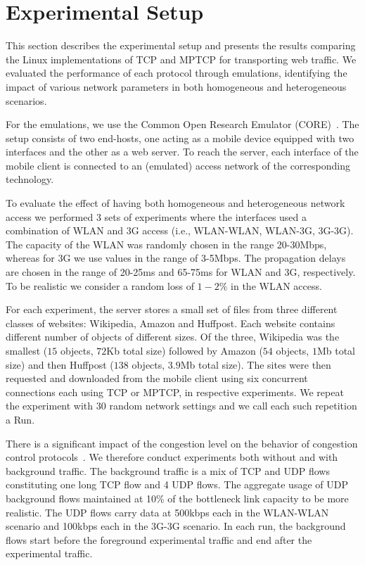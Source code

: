 \section{Experimental Setup }
\label{sec:exp-setup}
This section describes the experimental setup and presents the results comparing
the Linux implementations of TCP and MPTCP for transporting web traffic. We
evaluated the performance of each protocol through emulations, identifying the impact of various network
parameters in both homogeneous and heterogeneous scenarios. 

For the emulations, we use the Common Open Research Emulator (CORE)~\cite{CORE}. The setup consists of
two end-hosts, one acting as a mobile device equipped with two interfaces and the other as a web server. To reach the
server, each interface of the mobile client is connected to an (emulated) access network of the corresponding technology.

To evaluate the effect of having both homogeneous and heterogeneous network access we performed 3 sets
of experiments where the interfaces used a combination of WLAN and 3G access (i.e., WLAN-WLAN, WLAN-3G, 3G-3G).
The capacity of the WLAN was randomly chosen in the range 20-30Mbps, whereas for 3G we use values in the range of 3-5Mbps.
The propagation delays are chosen in the range of 20-25ms and 65-75ms for WLAN and 3G, respectively. To be realistic
we consider a random loss of $1-2\%$ in the WLAN access.

For each experiment, the server stores a small set of files from three different classes
of websites: Wikipedia, Amazon and Huffpost. Each website contains different number of objects of different sizes.
Of the three, Wikipedia was the smallest ($15$ objects, $72$Kb total size) followed by Amazon ($54$ objects, $1$Mb total size)
and then Huffpost ($138$ objects, $3.9$Mb total size). The sites were then requested and downloaded from the mobile
client using six concurrent connections each using TCP or MPTCP, in respective experiments. We repeat the experiment with 30 random
network settings and we call each such repetition a Run. 


There is a significant impact of the congestion level on the behavior of congestion control protocols~\cite{ha-background-traffic-comnet-2007}.
We therefore conduct experiments both without and with background traffic.  The background traffic is a mix of TCP and UDP flows constituting one
long TCP flow and 4 UDP flows. The aggregate usage of UDP background flows maintained at 10\% of the bottleneck link capacity to be more realistic.
The UDP flows carry data at 500kbps each in the WLAN-WLAN scenario and 100kbps each in the 3G-3G scenario.  In each run, the background flows
start before the foreground experimental traffic and end after the experimental traffic.



